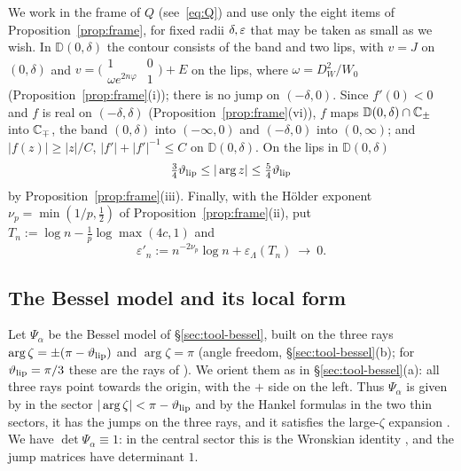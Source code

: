We work in the frame of $Q$ (see~\eqref{eq:Q}) and use only the eight items of Proposition~\ref{prop:frame}, for
fixed radii $\delta,\varepsilon$ that may be taken as small as we wish. In $\mathbb D(0,\delta)$ the contour consists of the
band and two lips, with $v=J$ on $(0,\delta)$ and
$v=\bigl(\begin{smallmatrix}1&0\\\omega e^{2n\varphi}&1\end{smallmatrix}\bigr)+E$ on the lips, where
$\omega=D_W^2/W_0$ (Proposition~\ref{prop:frame}(i)); there is no jump on $(-\delta,0)$. Since $f'(0)<0$ and $f$ is
real on $(-\delta,\delta)$ (Proposition~\ref{prop:frame}(vi)), $f$ maps $\mathbb D(0,\delta)\cap\mathbb{C}_\pm$ into $\mathbb{C}_\mp$, the band
$(0,\delta)$ into $(-\infty,0)$ and $(-\delta,0)$ into $(0,\infty)$; and $|f(z)|\ge|z|/C$, $|f'|+|f'|^{-1}\le C$ on
$\mathbb D(0,\delta)$. On the lips in $\mathbb D(0,\delta)$
\begin{equation}\label{eq:he-lipangle}
  \tfrac34\vartheta_{\mathrm{lip}}\le|\arg z|\le\tfrac54\vartheta_{\mathrm{lip}}
\end{equation}
by Proposition~\ref{prop:frame}(iii). Finally, with the H\"older exponent $\nu_p=\min(1/p,\frac12)$ of
Proposition~\ref{prop:frame}(ii), put $T_n:=\log n-\frac1p\log\max(4c,1)$ and
\begin{equation}\label{eq:he-epsprime}
  \varepsilon'_n:=n^{-2\nu_p}\log n+\varepsilon_\Lambda(T_n)\ \longrightarrow\ 0 .
\end{equation}

\subsection{The Bessel model and its local form}\label{sec:he-model}

Let $\Psi_\alpha$ be the Bessel model of \S\ref{sec:tool-bessel}, built on the three rays $\arg\zeta=\pm(\pi-\vartheta_{\mathrm{lip}})$
and $\arg\zeta=\pi$ (angle freedom, \S\ref{sec:tool-bessel}(b); for $\vartheta_{\mathrm{lip}}=\pi/3$ these are the rays of
\cite[\S6]{KMVV}). We orient them as in \S\ref{sec:tool-bessel}(a): all three rays point towards the origin, with the
$+$ side on the left. Thus $\Psi_\alpha$ is given by \cite[(6.23)]{KMVV} in the sector $|\arg\zeta|<\pi-\vartheta_{\mathrm{lip}}$ and by
the Hankel formulas \cite[(6.24)--(6.25)]{KMVV} in the two thin sectors, it has the jumps \cite[(6.16)--(6.18)]{KMVV}
on the three rays, and it satisfies the large-$\zeta$ expansion \cite[(6.28)]{KMVV}. We have $\det\Psi_\alpha\equiv1$:
in the central sector this is the Wronskian identity \cite[(10.28.2)]{DLMF}, and the jump matrices have determinant
$1$.

